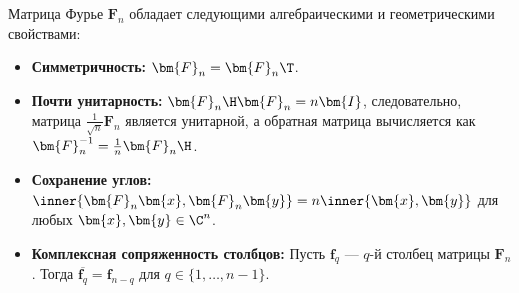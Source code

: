 \begin{tcbtheorem}
\label{thm:fourier_props}
    Матрица Фурье $\bm{F}_n$ обладает следующими алгебраическими и геометрическими свойствами:
    \begin{itemize}
        \item \textbf{Симметричность:} $\bm{F}_n = \bm{F}_n\T$.
        \item \textbf{Почти унитарность:} $\bm{F}_n\H \bm{F}_n = n \bm{I}$, следовательно, матрица $\frac{1}{\sqrt{n}} \bm{F}_n$ является унитарной, а обратная матрица вычисляется как $\bm{F}_n^{-1} = \frac{1}{n} \bm{F}_n\H$.
        \item \textbf{Сохранение углов:} $\inner{\bm{F}_n \bm{x}, \bm{F}_n \bm{y}} = n \inner{\bm{x}, \bm{y}}$ для любых $\bm{x}, \bm{y} \in \C^n$.
        \item \textbf{Комплексная сопряженность столбцов:} Пусть $\bm{f}_q$ — $q$-й столбец матрицы $\bm{F}_n$. Тогда $\overline{\bm{f}_q} = \bm{f}_{n-q}$ для $q \in \{1, \dots, n-1\}$.
    \end{itemize}
\end{tcbtheorem}

